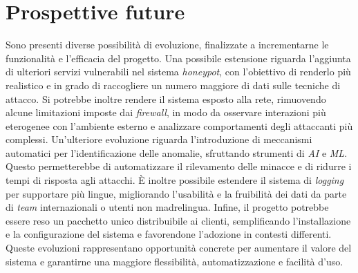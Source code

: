 \section{Prospettive future}
Sono presenti diverse possibilità di evoluzione, finalizzate a incrementarne le funzionalità e l'efficacia del progetto. 
Una possibile estensione riguarda l'aggiunta di ulteriori servizi vulnerabili nel sistema \textit{honeypot}, con l'obiettivo di renderlo più realistico e in grado di raccogliere un numero maggiore di dati sulle tecniche di attacco.  
Si potrebbe inoltre rendere il sistema esposto alla rete, rimuovendo alcune limitazioni imposte dai \textit{firewall}, in modo da osservare interazioni più eterogenee con l'ambiente esterno e analizzare comportamenti degli attaccanti più complessi.  
Un'ulteriore evoluzione riguarda l'introduzione di meccanismi automatici per l'identificazione delle anomalie, sfruttando strumenti di \textit{AI} e \textit{ML}. Questo permetterebbe di automatizzare il rilevamento delle minacce e di ridurre i tempi di risposta agli attacchi.  
È inoltre possibile estendere il sistema di \textit{logging} per supportare più lingue, migliorando l'usabilità e la fruibilità dei dati da parte di \textit{team} internazionali o utenti non madrelingua.  
Infine, il progetto potrebbe essere reso un pacchetto unico distribuibile ai clienti, semplificando l'installazione e la configurazione del sistema e favorendone l'adozione in contesti differenti.  
Queste evoluzioni rappresentano opportunità concrete per aumentare il valore del sistema e garantirne una maggiore flessibilità, automatizzazione e facilità d'uso.
